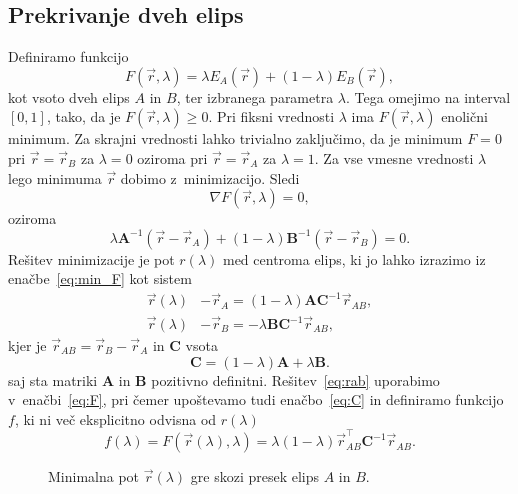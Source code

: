 \subsection{Prekrivanje dveh elips}
Definiramo funkcijo
\begin{equation}
    F(\vec{r}, \lambda) = \lambda E_A (\vec{r}) + (1 - \lambda) E_B (\vec{r}),
    \label{eq:F}
\end{equation}
kot vsoto dveh elips $A$ in $B$, ter izbranega parametra $\lambda$. Tega omejimo na
interval $[0,1]$, tako, da je $F(\vec{r}, \lambda) \geq 0$. Pri fiksni vrednosti 
$\lambda$ ima $F(\vec{r}, \lambda)$ enolični minimum. 
Za skrajni vrednosti lahko trivialno zaključimo, da je minimum $F=0$ pri 
$\vec{r} = \vec{r}_B$ za $\lambda=0$ oziroma pri $\vec{r} = \vec{r}_A$ za 
$\lambda=1$. 
Za vse vmesne vrednosti $\lambda$ lego minimuma $\vec{r}$ dobimo z~minimizacijo.
Sledi
\begin{equation}
    \nabla F(\vec{r}, \lambda) = 0,
\end{equation}
oziroma
\begin{equation}
    \lambda \mathbf{A}^{-1} (\vec{r} - \vec{r}_A) + (1-\lambda) \mathbf{B}^{-1}
    (\vec{r} - \vec{r}_B) = 0.
    \label{eq:min_F}
\end{equation}
Rešitev minimizacije je pot $r(\lambda)$ med centroma elips, ki jo lahko izrazimo 
iz enačbe~\ref{eq:min_F} kot sistem
\begin{align}
    \vec{r}(\lambda) &- \vec{r}_A = (1-\lambda) \mathbf{A} \mathbf{C}^{-1} 
        \vec{r}_{A B}, \nonumber \\
    \vec{r}(\lambda) &- \vec{r}_B = - \lambda \mathbf{B} \mathbf{C}^{-1} \vec{r}_{A B}, 
    \label{eq:rab}
\end{align}
kjer je $\vec{r}_{A B} = \vec{r}_B - \vec{r}_A$ in $\mathbf{C}$ vsota
\begin{equation}
    \mathbf{C} = (1-\lambda) \mathbf{A} + \lambda \mathbf{B}.
    \label{eq:C}
\end{equation}
saj sta matriki $\mathbf{A}$ in $\mathbf{B}$ pozitivno 
definitni.
Rešitev~\ref{eq:rab} uporabimo v~enačbi~\ref{eq:F}, pri čemer upoštevamo tudi
enačbo~\ref{eq:C} in definiramo funkcijo $f$, ki ni več eksplicitno odvisna od 
$r(\lambda)$
\begin{equation}
    f(\lambda) = F (\vec{r}(\lambda), \lambda) = \lambda (1-\lambda)
        \vec{r}_{A B}^{\top} \mathbf{C}^{-1} \vec{r}_{A B}.
\end{equation}
\begin{figure}[!ht]
    \centering
    \resizebox{.5\textwidth}{!}{}
    \caption{Minimalna pot $\vec{r}(\lambda)$ gre skozi presek elips $A$ in $B$.}
    \label{fig:path}
\end{figure}\\

